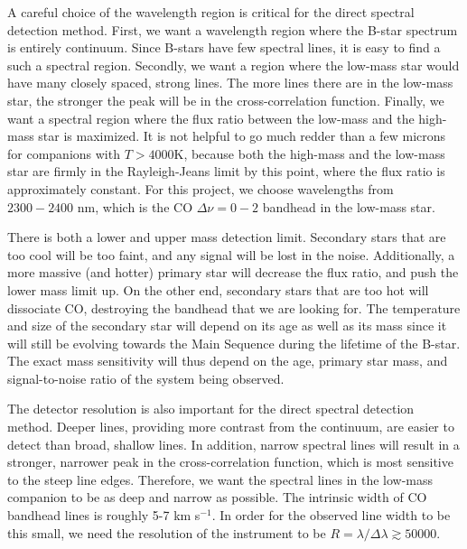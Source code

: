 \documentclass[11pt]{report}     %
\begin{document}
A careful choice of the wavelength region is critical for the direct spectral 
detection method. First, we want a wavelength region where the B-star spectrum
is entirely continuum. Since B-stars have few spectral lines, it is
easy to find a such a spectral region. Secondly, we want a region where the low-mass star
would have many closely spaced, strong lines. The more lines there are
in the low-mass star, the stronger the peak will be in the
cross-correlation function. Finally, we want a spectral region where the
flux ratio between the low-mass and the high-mass star is maximized.
It is not helpful to go much redder than a few microns for  
companions with $T>4000$K, because both the high-mass and
the low-mass star are firmly in the Rayleigh-Jeans limit by this
point, where the flux ratio is approximately constant. For this project,
we choose wavelengths from $2300-2400$ nm, which is the CO $\Delta\nu = 0-2$
bandhead in the low-mass star. 

There is both a lower and upper mass detection
limit. Secondary stars that are too cool will be too faint, and any
signal will be lost in the noise. Additionally, a more massive (and
hotter) primary star will decrease the flux ratio, and push the lower
mass limit up. On the other end, secondary
stars that are too hot will dissociate CO, destroying the bandhead
that we are looking for. The temperature and size of the secondary star will
depend on its age as well as its mass since it will still be
evolving towards the Main Sequence during the lifetime of the
B-star. The exact mass sensitivity will thus depend on the age,
primary star mass, and signal-to-noise ratio of the system being observed. 

The detector resolution is also important for the direct spectral detection
method. Deeper lines, providing more contrast from the
continuum, are easier to detect than broad, shallow lines. In
addition, narrow spectral lines will result in a stronger, narrower peak in the
cross-correlation function, which is most sensitive to the steep line
edges. Therefore, we want the spectral lines in the low-mass companion
to be as deep and narrow as possible. The intrinsic width of CO bandhead lines is
roughly 5-7 km s$^{-1}$. In order for the observed line width to be this
small, we need the resolution of the instrument to be $R =
\lambda/\Delta \lambda \gtrsim 50000$. 
\end{document}
